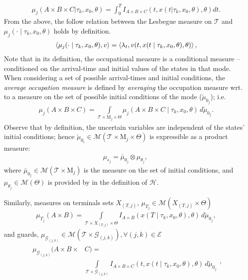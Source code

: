 \small
\begin{align}
\mu_j(A\times B\times C| \tau_k ,x_0,\theta)=\int_{0}^T I_{A\times B\times C}(t,x(t|\tau_k,x_0,\theta),\theta)dt.
\end{align}
\normalsize
From the above, the follow relation between the Lesbegue measure on $\mathcal T$ and $\mu_j(\cdot\mid \tau_k,x_0,\theta)$ holds by definition.
\begin{align}
\left\langle \mu_j(\cdot\mid \tau_k,x_0,\theta),v\right\rangle=\left\langle \lambda_t,v(t,x(t\mid \tau_k,x_0,\theta),\theta)\right\rangle,
\label{eq:mu_lambda}
\end{align}
Note that in its definition, the occupational measure is a conditional measure -- conditioned on the arrival-time and initial values of the states in that mode.
When considering a set of possible arrival-times and initial conditions, the {\em average occupation measure} is defined by {\em averaging} the occupation measure wrt. to a measure on the set of possible initial conditions of the mode ($\check\mu_{0_j}$); i.e.
\begin{align}
\mu_j(A\times B\times C)=\int\limits_{\mathcal T\times \mathrm M_j\times \Theta}\mu_j(A\times B\times C\mid \tau_k,x_0,\theta)\,d\check \mu_{0_j}.
\label{eq:mu_avg}
\end{align}
\normalsize
Observe that by definition, the uncertain variables are independent of the states' initial conditions; hence $\check\mu_{0_i}\in \mathcal M(\mathcal T\times\mathrm M_j\times \Theta)$ is expressible as a product measure:
\begin{align}
\mu_{s_j}=\bar\mu_{0_j}\otimes \mu_{\theta_j},\
\end{align}
where $\bar \mu_{0_j}\in \mathcal M(\mathcal T\times \mathrm M_j)$ is the measure on the set of initial conditions, and $\mu_{\theta_j}\in \mathcal M(\Theta)$ is provided by in the definition of $\mathcal H$.\par
Similarly, measures on terminals sets $X_{(T,j)}$, $\mu_{T_j}\in \mathcal M(X_{(T,j)}\times \Theta)$
\begin{align}
\mu_{T_j}(A\times B)=\int\limits_{\mathcal T\times X_{(T,j)}\times \Theta}I_{A\times B}(x(T\mid \tau_k,x_0,\theta),\theta)\,d\check\mu_{0_{j}},
\end{align}
and guards, $\mu_{\mathcal G_{(j,k)}}\in \mathcal M(\mathcal T\times \mathcal G_{(j,k)}),\forall(j,k)\in \mathcal E$
\begin{align}
\begin{split}
\mu_{\mathcal G_{(j,k)}}(A\times B\times& C)=\\&\int\limits_{\mathcal T\times \mathcal G_{(j,k)}}I_{A\times B\times C}(t,x(t\mid \tau_k,x_0,\theta),\theta)\,d\check\mu_{0_{j}}
\end{split},
\end{align}

